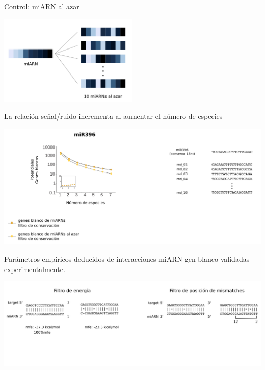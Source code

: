 \documentclass{beamer}
\begin{document}
\begin{frame}{Control: miARN al azar}
	\begin{center}
		\includegraphics[width=0.5\textwidth]{img/shuffle_02.png}
	\end{center}
\end{frame}

\begin{frame}{La relación señal/ruido incrementa al aumentar el número de especies}
	\begin{center}
		\includegraphics[width=1\textwidth]{img/NAR_fig2_02.png}
	\end{center}
\end{frame}


\begin{frame}{Parámetros empíricos deducidos de interacciones miARN-gen blanco validadas experimentalmente.}
	\begin{center}
		\includegraphics[width=1\textwidth]{img/filtros_empiricos_01.png}
	\end{center}
\end{frame}
\end{document}
